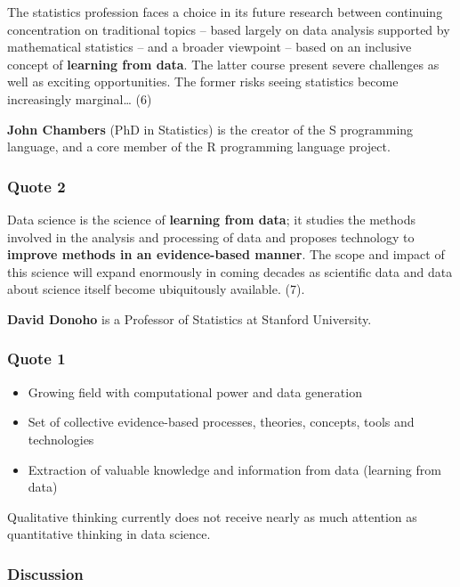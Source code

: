 \documentclass[
  letterpaper,
  DIV=11,
  numbers=noendperiod,
  oneside]{scrreprt}
\providecommand{\tightlist}{%
  \setlength{\itemsep}{0pt}\setlength{\parskip}{0pt}}\usepackage{longtable,booktabs,array}
\begin{document}
The statistics profession faces a choice in its future research between
continuing concentration on traditional topics -- based largely on data
analysis supported by mathematical statistics -- and a broader viewpoint
-- based on an inclusive concept of \textbf{learning from data}. The
latter course present severe challenges as well as exciting
opportunities. The former risks seeing statistics become increasingly
marginal\ldots{} (6)

\textbf{John Chambers} (PhD in Statistics) is the creator of the S
programming language, and a core member of the R programming language
project.

\hypertarget{quote-2}{%
\subsubsection{\texorpdfstring{Quote 2
{💬}}{Quote 2 💬}}\label{quote-2}}

Data science is the science of \textbf{learning from data}; it studies
the methods involved in the analysis and processing of data and proposes
technology to \textbf{improve methods in an evidence-based manner}. The
scope and impact of this science will expand enormously in coming
decades as scientific data and data about science itself become
ubiquitously available. (7).

\textbf{David Donoho} is a Professor of Statistics at Stanford
University.

\hypertarget{quote-1-1}{%
\subsubsection{Quote 1}\label{quote-1-1}}

\begin{itemize}
\tightlist
\item
  Growing field with computational power and data generation
\item
  Set of collective evidence-based processes, theories, concepts, tools
  and technologies
\item
  Extraction of valuable knowledge and information from data (learning
  from data)
\end{itemize}

Qualitative thinking currently does not receive nearly as much attention
as quantitative thinking in data science.

\hypertarget{discussion-2}{%
\subsubsection{\texorpdfstring{Discussion
{💬}}{Discussion 💬}}\label{discussion-2}}
\end{document}
